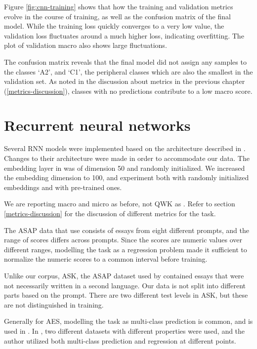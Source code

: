 Figure \ref{fig:cnn-training} shows that how the training and validation
metrics evolve in the course of training, as well as the confusion matrix of
the final model. While the training loss quickly converges to a very low
value, the validation loss fluctuates around a much higher loss, indicating
overfitting. The plot of validation macro \FI also shows large fluctuations.

The confusion matrix reveals that the final model did not assign any samples
to the classes `A2', and `C1', the peripheral classes which are also the
smallest in the validation set. As noted in the discussion about metrics in
the previous chapter (\ref{metrics-discussion}), classes with no predictions
contribute to a low macro \FI score.


\section{Recurrent neural networks}


Several \ac{RNN} models were implemented based on the architecture described
in \textcite{taghipour16}. Changes to their architecture were made in order
to accommodate our data. The embedding layer in \textcite{taghipour16} was of
dimension 50 and randomly initialized. We increased the embedding dimension
to 100, and experiment both with randomly initialized embeddings and with
pre-trained ones.

We are reporting macro and micro \FI as before, not QWK as
\citeauthor{taghipour16}. Refer to section \ref{metrics-discussion} for the
discussion of different metrics for the task.

The ASAP data that \citeauthor{taghipour16} use consists of essays from eight
different prompts, and the range of scores differs across prompts. Since the
scores are numeric values over different ranges, modelling the task as a
regression problem made it sufficient to normalize the numeric scores to a
common interval before training.

Unlike our corpus, ASK, the ASAP dataset used by \citeauthor{taghipour16}
contained essays that were not necessarily written in a second language. Our
data is not split into different parts based on the prompt. There are two
different test levels in ASK, but these are not distinguished in training.


Generally for \ac{AES}, modelling the task as multi-class prediction is
common, and is used in \textcite{vajjala18universalCEFR}. In
\textcite{vajjala17}, two different datasets with different properties were
used, and the author utilized both multi-class prediction and regression at
different points. 


